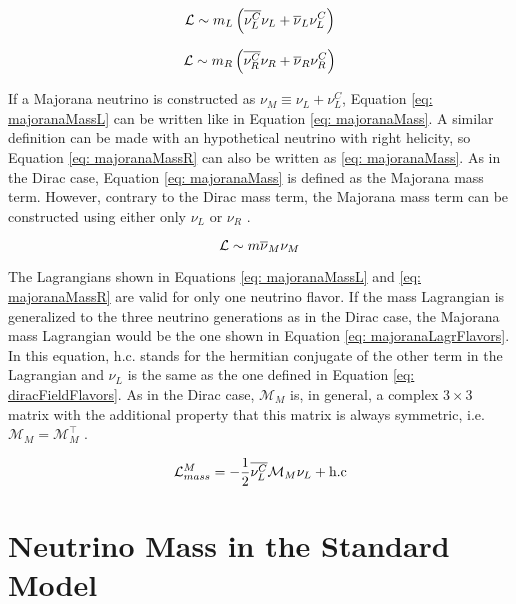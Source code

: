 \begin{equation}\label{eq: majoranaMassL}
\mathcal{L} \sim m_{L}\left(\overline{\nu^{C}_{L}}\nu_{L}  + \overline{\nu}_{L}\nu^{C}_{L}\right)
\end{equation}

\begin{equation}\label{eq: majoranaMassR}
\mathcal{L} \sim m_{R}\left(\overline{\nu^{C}_{R}}\nu_{R}  + \overline{\nu}_{R}\nu^{C}_{R}\right) 
\end{equation}

If a Majorana neutrino is constructed as $\nu_{M} \equiv \nu_{L} + \nu_{L}^{C}$, Equation \ref{eq: majoranaMassL} can be written like in Equation \ref{eq: majoranaMass}. A similar definition can be made with an hypothetical neutrino with right helicity, so Equation \ref{eq: majoranaMassR} can also be written as \ref{eq: majoranaMass}. As in the Dirac case, Equation \ref{eq: majoranaMass} is defined as the Majorana mass term. However, contrary to the Dirac mass term, the Majorana mass term can be constructed using either only $\nu_{L}$ or $\nu_{R}$ \cite{NeutrinoMass}. 

\begin{equation}\label{eq: majoranaMass}
\mathcal{L} \sim m\overline{\nu}_{M}\nu_{M}
\end{equation}


The Lagrangians shown in Equations \ref{eq: majoranaMassL} and \ref{eq: majoranaMassR} are valid for only one neutrino flavor. If the mass Lagrangian is generalized to the three neutrino generations as in the Dirac case, the Majorana mass Lagrangian would be the one shown in Equation \ref{eq: majoranaLagrFlavors}. In this equation, h.c. stands for the hermitian conjugate of the other term in the Lagrangian and $\nu_{L}$ is the same as the one defined in Equation \ref{eq: diracFieldFlavors}. As in the Dirac case, $\mathcal{M}_{M}$ is, in general, a complex $3 \times 3$ matrix with the additional property that this matrix is always symmetric, i.e. $\mathcal{M}_{M} = \mathcal{M}_{M}^{\intercal}$ \cite{NeutrinoMass}. 

\begin{equation}\label{eq: majoranaLagrFlavors}
\mathcal{L}_{mass}^{M} = -\frac{1}{2}\overline{\nu_{L}^{C}}\mathcal{M}_{M}\nu_{L} + \text{h.c}
\end{equation}


\section{Neutrino Mass in the Standard Model}

